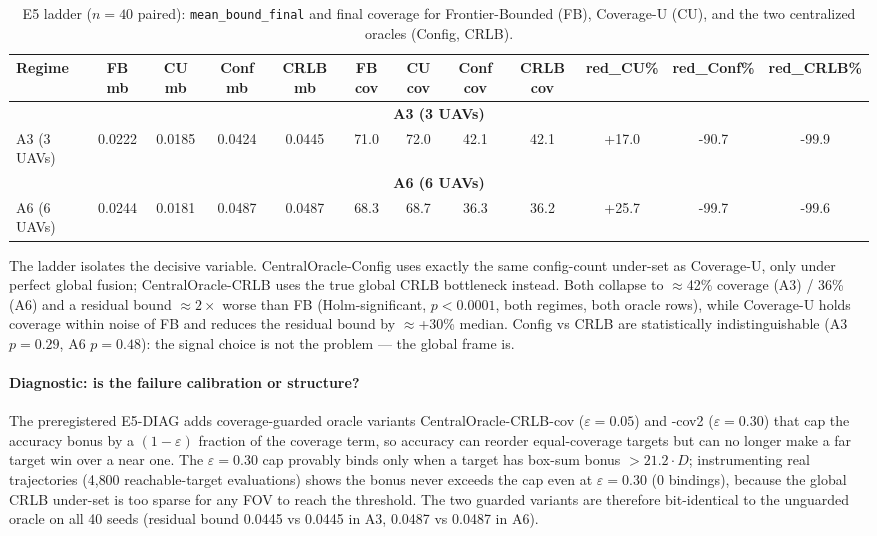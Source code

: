 \documentclass[journal]{IEEEtran}
\newcommand{\CU}{Coverage-U}
\begin{document}
\begin{table}[t]
\caption{E5 ladder ($n = 40$ paired): \texttt{mean\_bound\_final} and final coverage for Frontier-Bounded (FB), \CU{} (CU), and the two centralized oracles (Config, CRLB).}
\label{tab:e5}
\centering
\small
\setlength{\tabcolsep}{3pt}
\begin{tabular}{l c c c c c c c c c c c}
\toprule
Regime & FB mb & CU mb & Conf mb & CRLB mb & FB cov & CU cov & Conf cov & CRLB cov & red\_CU\% & red\_Conf\% & red\_CRLB\% \\
\midrule
\multicolumn{12}{c}{\textbf{A3 (3 UAVs)}} \\
\midrule
A3 (3 UAVs) & 0.0222 & 0.0185 & 0.0424 & 0.0445 & 71.0 & 72.0 & 42.1 & 42.1 & +17.0 & -90.7 & -99.9 \\
\multicolumn{12}{c}{\textbf{A6 (6 UAVs)}} \\
\midrule
A6 (6 UAVs) & 0.0244 & 0.0181 & 0.0487 & 0.0487 & 68.3 & 68.7 & 36.3 & 36.2 & +25.7 & -99.7 & -99.6 \\
\bottomrule
\end{tabular}
\end{table}


The ladder isolates the decisive variable. CentralOracle-Config uses
exactly the same config-count under-set as \CU, only under perfect global
fusion; CentralOracle-CRLB uses the true global CRLB bottleneck instead. Both
collapse to $\approx$42\% coverage (A3) / 36\% (A6) and a residual bound
$\approx 2\times$ worse than FB (Holm-significant, $p < 0.0001$, both regimes,
both oracle rows), while \CU{} holds coverage within noise of FB and reduces
the residual bound by $\approx$+30\% median. Config vs CRLB are statistically
indistinguishable (A3 $p = 0.29$, A6 $p = 0.48$): the signal choice is not the
problem --- the global frame is.

\paragraph{Diagnostic: is the failure calibration or structure?}
The preregistered E5-DIAG adds coverage-guarded oracle variants
CentralOracle-CRLB-cov ($\varepsilon = 0.05$) and -cov2 ($\varepsilon = 0.30$)
that cap the accuracy bonus by a $(1 - \varepsilon)$ fraction of the coverage
term, so accuracy can reorder equal-coverage targets but can no longer make a
far target win over a near one. The $\varepsilon = 0.30$ cap provably binds
only when a target has box-sum bonus $> 21.2 \cdot D$; instrumenting real
trajectories (4{,}800 reachable-target evaluations) shows the bonus never
exceeds the cap even at $\varepsilon = 0.30$ (0 bindings), because the global
CRLB under-set is too sparse for any FOV to reach the threshold. The two
guarded variants are therefore bit-identical to the unguarded oracle on all 40
seeds (residual bound 0.0445 vs 0.0445 in A3, 0.0487 vs 0.0487 in A6).
\end{document}
